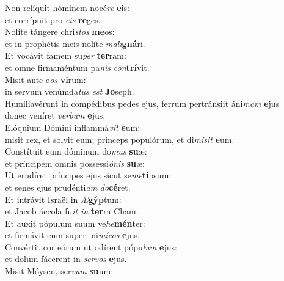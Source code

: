 \evenverse Non relíquit hóminem nocé\textit{re} \textbf{e}is:~\*\\
\evenverse et corrípuit pro \textit{e}\textit{is} \textbf{re}ges.\\
\oddverse Nolíte tángere chri\textit{stos} \textbf{me}os:~\*\\
\oddverse et in prophétis meis nolíte \textit{ma}\textit{li}\textbf{gná}ri.\\
\evenverse Et vocávit famem su\textit{per} \textbf{ter}ram:~\*\\
\evenverse et omne firmaméntum pa\textit{nis} \textit{con}\textbf{trí}vit.\\
\oddverse Misit ante e\textit{os} \textbf{vi}rum:~\*\\
\oddverse in servum venúmda\textit{tus} \textit{est} \textbf{Jo}seph.\\
\evenverse Humiliavérunt in compédibus pedes ejus, ferrum pertránsiit áni\textit{mam} \textbf{e}jus~\*\\
\evenverse donec veníret \textit{ver}\textit{bum} \textbf{e}jus.\\
\oddverse Elóquium Dómini inflammá\textit{vit} \textbf{e}um:~\*\\
\oddverse misit rex, et solvit eum; princeps populórum, et di\textit{mí}\textit{sit} \textbf{e}um.\\
\evenverse Constítuit eum dóminum do\textit{mus} \textbf{su}æ:~\*\\
\evenverse et príncipem omnis possessi\textit{ó}\textit{nis} \textbf{su}æ:\\
\oddverse Ut erudíret príncipes ejus sicut se\textit{me}\textbf{tí}psum:~\*\\
\oddverse et senes ejus prudénti\textit{am} \textit{do}\textbf{cé}ret.\\
\evenverse Et intrávit Israël in \textit{Æ}\textbf{gýp}tum:~\*\\
\evenverse et Jacob áccola fu\textit{it} \textit{in} \textbf{ter}ra Cham.\\
\oddverse Et auxit pópulum suum ve\textit{he}\textbf{mén}ter:~\*\\
\oddverse et firmávit eum super ini\textit{mí}\textit{cos} \textbf{e}jus.\\
\evenverse Convértit cor eórum ut odírent pópu\textit{lum} \textbf{e}jus:~\*\\
\evenverse et dolum fácerent in \textit{ser}\textit{vos} \textbf{e}jus.\\
\oddverse Misit Móysen, ser\textit{vum} \textbf{su}um:~\*\\
